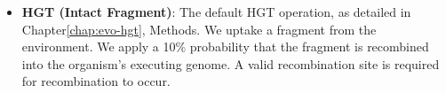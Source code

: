 \documentclass[PhD]{msu-thesis}
\begin{document}
\begin{itemize}
	\item \textbf{HGT (Intact Fragment)}: The default HGT operation, as detailed in Chapter\ref{chap:evo-hgt}, Methods. We uptake a fragment from the environment. We apply a 10\% probability that the fragment is recombined into the organism's executing genome. A valid recombination site is required for recombination to occur.



	

\end{itemize}
\end{document}
